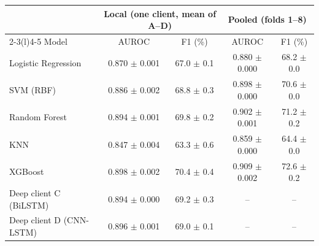 \begin{tabular}{@{}lcccc@{}}
\toprule
 & \multicolumn{2}{c}{Local (one client, mean of A--D)} & \multicolumn{2}{c}{Pooled (folds 1--8)} \\
\cmidrule(lr){2-3}\cmidrule(l){4-5}
Model & AUROC & F1 (\%) & AUROC & F1 (\%) \\
\midrule
Logistic Regression & 0.870 $\pm$ 0.001 & 67.0 $\pm$ 0.1 & 0.880 $\pm$ 0.000 & 68.2 $\pm$ 0.0 \\
SVM (RBF) & 0.886 $\pm$ 0.002 & 68.8 $\pm$ 0.3 & 0.898 $\pm$ 0.000 & 70.6 $\pm$ 0.0 \\
Random Forest & 0.894 $\pm$ 0.001 & 69.8 $\pm$ 0.2 & 0.902 $\pm$ 0.001 & 71.2 $\pm$ 0.2 \\
KNN & 0.847 $\pm$ 0.004 & 63.3 $\pm$ 0.6 & 0.859 $\pm$ 0.000 & 64.4 $\pm$ 0.0 \\
XGBoost & 0.898 $\pm$ 0.002 & 70.4 $\pm$ 0.4 & 0.909 $\pm$ 0.002 & 72.6 $\pm$ 0.2 \\
\midrule
Deep client C (BiLSTM) & 0.894 $\pm$ 0.000 & 69.2 $\pm$ 0.3 & -- & -- \\
Deep client D (CNN-LSTM) & 0.896 $\pm$ 0.001 & 69.0 $\pm$ 0.1 & -- & -- \\
\bottomrule
\end{tabular}
